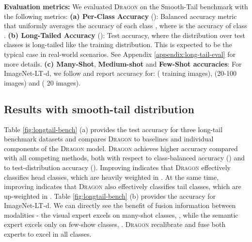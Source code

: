 \documentclass[10pt,twocolumn,letterpaper]{article}
\newcommand{\DRAGON}{\textsc{Dragon}}
\newcommand{\SmoothTail}{Smooth-Tail}
\begin{document}
\begin{table}
\begin{center}
\end{center}
\caption{Comparing \DRAGON{} against common late-fusion approaches on the validation set of CUB-LT.}
\label{fusion-bench}
\end{table}

\textbf{Evaluation metrics:}
We evaluated \DRAGON{} on the \SmoothTail{} benchmark with the following metrics: 
\newline\textbf{(a) Per-Class Accuracy} (): Balanced accuracy metric that uniformly averages the accuracy of each class  , where  is the accuracy of class .  
\newline\textbf{(b) Long-Tailed Accuracy} (): Test accuracy, where the distribution over test classes is long-tailed like the training distribution. This is expected to be the typical case in real-world scenarios. See Appendix \ref{appendix:long-tail-eval} for more details.
\newline\textbf{(c) Many-Shot}, \textbf{Medium-shot} and \textbf{Few-Shot accuracies}: For ImageNet-LT-d, we follow \cite{openlongtailrecognition} and report accuracy for:  ( training images),  (20-100 images) and  ( 20 images).

\subsection{Results with smooth-tail distribution}
Table \ref{fig:longtail-bench} (a) provides the test accuracy for three long-tail benchmark datasets and compares \DRAGON{} to baselines and individual components of the \DRAGON{} model. \DRAGON{} achieves higher accuracy compared with all competing methods, both with respect to class-balanced accuracy () and to test-distribution accuracy ().
Improving  indicates that \DRAGON{} effectively classifies head classes, which are heavily weighted in . At the same time, improving  indicates that \DRAGON{} also effectively classifies tail classes, which are up-weighted in . 
\newline\indent Table \ref{fig:longtail-bench} (b) provides the  accuracy for ImageNet-LT-d. We can directly see the benefit of fusion information between modalities - the visual expert excels on many-shot classes, , while the semantic expert excels only on few-show classes, . \DRAGON{} recalibrate and fuse both experts to excel in all classes.
\end{document}
